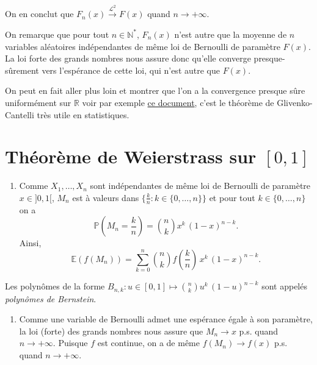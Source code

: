 On en conclut que
\(F_n(x) \overset{\mathcal{L}^2}{\longrightarrow} F(x)\) quand
\(n\to+\infty\).

\label{IV-answer-fdremp-ps}
On remarque que pour tout \(n\in\mathbb{N}^\ast\), \(F_n(x)\) n'est
autre que la moyenne de \(n\) variables aléatoires indépendantes de même
loi de Bernoulli de paramètre \(F(x)\). La loi forte des grands nombres
nous assure donc qu'elle converge presque-sûrement vers l'espérance de
cette loi, qui n'est autre que \(F(x)\).

\begin{remarque}\label{IV-pour-aller-plus-loin}

On peut en fait aller plus loin et montrer que l'on a la convergence
presque sûre uniformément sur \(\mathbb{R}\) voir par exemple
\href{http://math.univ-lyon1.fr/~gelineau/devagreg/Theoreme_Dini.pdf}{ce
document}, c'est le théorème de Glivenko-Cantelli très utile en
statistiques.
\end{remarque}

\section{Théorème de Weierstrass sur
\([0,1]\)}\label{IV-thuxe9oruxe8me-de-weierstrass-sur-01-1}

\label{IV-answer-weier-thm}

\begin{enumerate}
\def\labelenumi{\arabic{enumi}.}
\tightlist
\item
  Comme \(X_1,\dots,X_n\) sont indépendantes de même loi de Bernoulli de
  paramètre \(x\in]0,1[\), \(M_n\) est à valeurs dans
  \(\bigl\{\frac{k}{n} : k \in \{0,\dots,n\} \bigr\}\) et pour tout
  \(k\in\{0,\dots,n\}\) on a
  \[\mathbb{P}\left(M_n = \dfrac{k}{n}\right) = \binom{n}{k} x^k\,(1-x)^{n-k}.\]
  Ainsi,
  \[\mathbb{E}\left(f(M_n)\right) = \sum_{k=0}^{n} \binom{n}{k} f\left(\dfrac{k}{n}\right)\, x^k\,(1-x)^{n-k}.\]
\end{enumerate}

Les polynômes de la forme
\(B_{n,k} : u\in [0,1] \mapsto \binom{n}{k} u^k\,(1-u)^{n-k}\) sont
appelés \emph{polynômes de Bernstein}.

\begin{enumerate}
\def\labelenumi{\arabic{enumi}.}
\setcounter{enumi}{1}
\tightlist
\item
  Comme une variable de Bernoulli admet une espérance égale à son
  paramètre, la loi (forte) des grands nombres nous assure que
  \(M_n \to x\) p.s. quand \(n\to+\infty\). Puisque \(f\) est continue,
  on a de même \(f\left(M_n\right) \to f(x)\) p.s. quand
  \(n\to+\infty\).
\end{enumerate}

